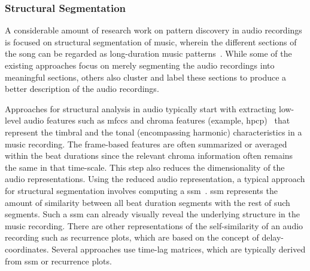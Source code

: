 

\subsubsection{Structural Segmentation}
\label{sec:structural_segmentation}

A considerable amount of research work on pattern discovery in audio recordings is focused on structural segmentation of music, wherein the different sections of the song can be regarded as long-duration music patterns~\citep{paulus2010state}. While some of the existing approaches focus on merely segmenting the audio recordings into meaningful sections, others also cluster and label these sections to produce a better description of the audio recordings. 

Approaches for structural analysis in audio typically start with extracting low-level audio features such as \glspl{mfcc} and chroma features (example, \gls{hpcp})~\citep{gomez2006tonal} that represent the timbral and the tonal (encompassing harmonic) characteristics in a music recording. The frame-based features are often summarized or averaged within the beat durations since the relevant chroma information often remains the same in that time-scale. This step also reduces the dimensionality of the audio representations. Using the reduced audio representation, a typical approach for structural segmentation involves computing a \gls{ssm}~\citep{foote2000automatic}. \Gls{ssm} represents the amount of similarity between all beat duration segments with the rest of such segments. Such a \gls{ssm} can already visually reveal the underlying structure in the music recording. There are other representations of the self-similarity of an audio recording such as recurrence plots, which are based on the concept of delay-coordinates. Several approaches use time-lag matrices, which are typically derived from \gls{ssm} or recurrence plots.

